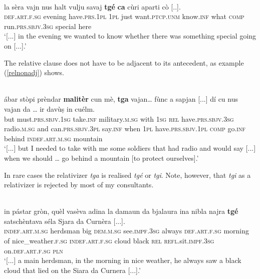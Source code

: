 \ea

\\
\gll [...] la sèra vajn nus halt vulju savaj \textbf{tgé} \textbf{ca} cùri aparti cò [..].\\
{} \textsc{def.art.f.sg} evening have.\textsc{prs.1pl} \textsc{1pl} just want.\textsc{ptcp.unm} know.\textsc{inf} what \textsc{comp} run.\textsc{prs.sbjv.3sg} special here\\
\glt `[...] in the evening we wanted to know whether there was something special going on [...].'
\z

The relative clause does not have to be adjacent to its antecedent, as example (\ref{relnonadj}) shows.

\ea
\label{relnonadj}
\\
\gll  [...] ábar stòpi prèndar \textbf{malitèr} cun mè, \textbf{tga} vajan… fùnc a sapjan [...] dí cu nus vajan da … ir davùṣ in cuélm.\\
{} but must.\textsc{prs.sbjv.1sg} take.\textsc{inf} military.\textsc{m.sg} with \textsc{1sg} \textsc{rel} have.\textsc{prs.sbjv.3sg} radio.\textsc{m.sg} and can.\textsc{prs.sbjv.3pl} {} say.\textsc{inf} when \textsc{1pl} have.\textsc{prs.sbjv.1pl} \textsc{comp} {} go.\textsc{inf} behind \textsc{indef.art.m.sg} mountain\\
\glt `[...] but I needed to take with me some soldiers that had radio and would say [...] when we should … go behind a mountain [to protect ourselves].'
\z

In rare cases the relativizer \textit{tga} is realised \textit{tgé} or \textit{tgi}. Note, however, that \textit{tgi} as a relativizer is rejected by most of my consultants.

\ea

\\
\gll [...] in pástar gròn, quèl vasèva adina la damaun da bjalaura ina nibla najra \textbf{tgé} satschèntava séla Sjara da Curnèra [...].\\
{} \textsc{indef.art.m.sg} herdsman big \textsc{dem.m.sg} see.\textsc{impf.3sg} always \textsc{def.art.f.sg} morning of nice\_weather.\textsc{f.sg} \textsc{indef.art.f.sg} cloud black \textsc{rel} \textsc{refl}.sit.\textsc{impf.3sg} on.\textsc{def.art.f.sg} \textsc{pln}\\
\glt `[...] a main herdsman, in the morning in nice weather, he always saw a black cloud that lied on the Siara da Curnera [...].'
\z

